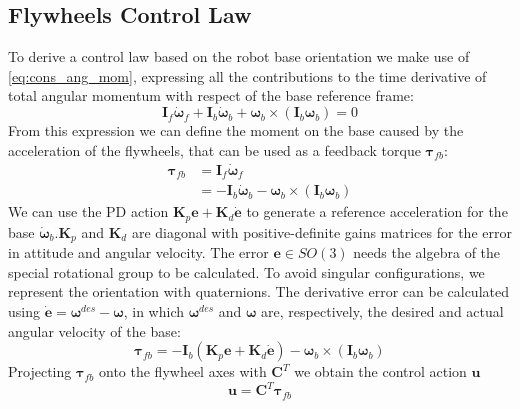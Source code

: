 \documentclass[letterpaper, 10 pt, conference]{ieeeconf}  %
\begin{document}
\subsection{Flywheels Control Law}
\label{subsec:control_law}
To derive a control law based on the robot base orientation we make use of \eqref{eq:cons_ang_mom}, expressing all the contributions to the time derivative of total angular momentum with respect of the base reference frame:
\begin{equation*}
\bm{I}_f \dot{\bm{\omega}}_f + \bm{I}_b \dot{\bm{\omega}}_b + \bm{\omega}_b \times \left( \bm{I}_b \bm{\omega}_b\right) = 0
\end{equation*}
From this expression we can define the moment on the base caused by the acceleration of the flywheels, that can be used as a feedback torque $\bm{\tau}_{fb}$:
\begin{equation*}
\begin{split}
\bm{\tau}_{fb} &= \bm{I}_f \dot{\bm{\omega}}_f \\
&= - \bm{I}_b \dot{\bm{\omega}}_b - \bm{\omega}_b \times \left( \bm{I}_b \bm{\omega}_b\right)
\end{split}
\end{equation*}
We can use the PD action $\bm{K}_p \bm{e} + \bm{K}_d \dot{\bm{e}}$ to generate a reference acceleration for the base $\dot{\bm{\omega}}_b$.$\bm{K}_p$ and $\bm{K}_d$ are diagonal with positive-definite gains matrices for the error in attitude and angular velocity.
The error $\bm{e} \in SO(3)$ needs the algebra of the special rotational group to be calculated. To avoid singular configurations, we represent the orientation with quaternions.
The derivative error can be calculated using $\dot{\bm{e}} = \bm{\omega}^{des} - \bm{\omega}$, in which $\bm{\omega}^{des}$ and $\bm{\omega}$ are, respectively, the desired and actual angular velocity of the base:
\begin{equation*}
\bm{\tau}_{fb} = - \bm{I}_b \left(\bm{K}_p \bm{e} + \bm{K}_d \dot{\bm{e}}\right) - \bm{\omega}_b \times \left( \bm{I}_b \bm{\omega}_b\right)
\end{equation*}
Projecting $\bm{\tau}_{fb}$ onto the flywheel axes with $\bm{C}^T$ we obtain the control action $\bm{u}$
\begin{equation}
\label{eq:ctrl_law}
\bm{u} = \bm{C}^T \bm{\tau}_{fb}
\end{equation}
\end{document}
